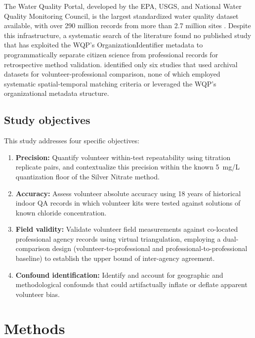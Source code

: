 \documentclass[lineno]{wlpeerj}
\begin{document}
The Water Quality Portal, developed by the EPA, USGS, and National Water Quality Monitoring Council, is the largest standardized water quality dataset available, with over 290 million records from more than 2.7 million sites \citep{Read2017}. Despite this infrastructure, a systematic search of the literature found no published study that has exploited the WQP's OrganizationIdentifier metadata to programmatically separate citizen science from professional records for retrospective method validation. \citet{Albus2019} identified only six studies that used archival datasets for volunteer-professional comparison, none of which employed systematic spatial-temporal matching criteria or leveraged the WQP's organizational metadata structure.

\subsection{Study objectives}

This study addresses four specific objectives:

\begin{enumerate}
  \item \textbf{Precision:} Quantify volunteer within-test repeatability using titration replicate pairs, and contextualize this precision within the known 5~mg/L quantization floor of the Silver Nitrate method.
  \item \textbf{Accuracy:} Assess volunteer absolute accuracy using 18 years of historical indoor QA records in which volunteer kits were tested against solutions of known chloride concentration.
  \item \textbf{Field validity:} Validate volunteer field measurements against co-located professional agency records using virtual triangulation, employing a dual-comparison design (volunteer-to-professional and professional-to-professional baseline) to establish the upper bound of inter-agency agreement.
  \item \textbf{Confound identification:} Identify and account for geographic and methodological confounds that could artifactually inflate or deflate apparent volunteer bias.
\end{enumerate}

\section{Methods}
\end{document}

